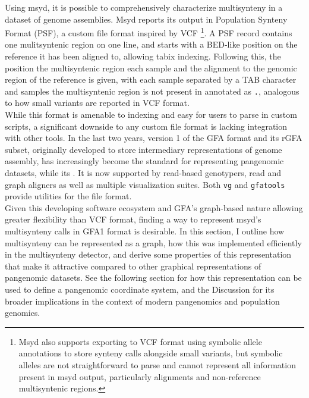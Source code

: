 \newcommand{\aln}{\mathcal{A}}

Using msyd, it is possible to comprehensively characterize multisynteny in a dataset of genome assemblies.
Msyd reports its output in Population Synteny Format (PSF), a custom file format inspired by VCF
\footnote{Msyd also supports exporting to VCF format using symbolic allele annotations to store synteny calls alongside small variants, but symbolic alleles are not straightforward to parse and cannot represent all information present in msyd output, particularly alignments and non-reference multisyntenic regions.}.
A PSF record contains one mulitsyntenic region on one line, and starts with a BED-like position on the reference it has been aligned to, allowing tabix indexing.
Following this, the position the multisyntenic region each sample and the alignment to the genomic region of the reference is given, with each sample separated by a TAB character and samples the multisyntenic region is not present in annotated as \texttt{.}, analogous to how small variants are reported in VCF format.
\\
While this format is amenable to indexing and easy for users to parse in custom scripts, a significant downside to any custom file format is lacking integration with other tools.
In the last two years, version 1 of the GFA format and its rGFA subset, originally developed to store intermediary representations of genome assembly, has increasingly become the standard for representing pangenomic datasets, while its .
It is now supported by read-based genotypers, read and graph aligners as well as multiple visualization suites\cite{guarracino22, wick15}.
Both \texttt{vg} and \texttt{gfatools} provide utilities for the file format\cite{garrison18, gfatools}.\\
Given this developing software ecosystem and GFA's graph-based nature allowing greater flexibility than VCF format, finding a way to represent msyd's multisynteny calls in GFA1 format is desirable.
In this section, I outline how multisynteny can be represented as a graph, how this was implemented efficiently in the multisynteny detector, and derive some properties of this representation that make it attractive compared to other graphical representations of pangenomic datasets.
See the following section for how this representation can be used to define a pangenomic coordinate system, and the Discussion for its broader implications in the context of modern pangenomics and population genomics. %

